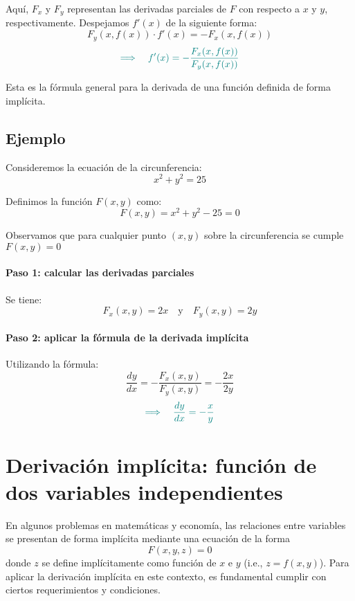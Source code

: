 \documentclass{article}
\begin{document}
Aquí, \( F_x \) y \( F_y \) representan las derivadas parciales de \( F \) con respecto a \( x \) y \( y \), respectivamente. Despejamos \( f'(x) \) de la siguiente forma:
\[
F_y(x,f(x)) \cdot f'(x) = -F_x(x,f(x))
\]
\[
\color{teal}
\Longrightarrow \quad f'(x) = -\frac{F_x(x,f(x))}{F_y(x,f(x))}
\]

Esta es la fórmula general para la derivada de una función definida de forma implícita.
\subsection*{Ejemplo}

Consideremos la ecuación de la circunferencia:
\[
x^2 + y^2 = 25
\]

Definimos la función \( F(x,y) \) como:
\[
F(x,y) = x^2 + y^2 - 25 = 0
\]

Observamos que para cualquier punto \((x,y)\) sobre la circunferencia se cumple \(F(x,y) = 0\)

\paragraph{\color{teal}Paso 1: calcular las derivadas parciales}  
Se tiene:
\[
F_x(x,y) = 2x \quad \text{y} \quad F_y(x,y) = 2y
\]

\paragraph{\color{teal}Paso 2: aplicar la fórmula de la derivada implícita}  
Utilizando la fórmula:
\[
\frac{dy}{dx} = -\frac{F_x(x,y)}{F_y(x,y)} = -\frac{2x}{2y}
\]
\[
\color{teal}
\Longrightarrow \quad \frac{dy}{dx} = -\frac{x}{y}
\]

\section*{Derivación implícita: función de dos variables independientes}

En algunos problemas en matemáticas y economía, las relaciones entre variables se presentan de forma implícita mediante una ecuación de la forma
\[
F(x,y,z) = 0
\]
donde \( z \) se define implícitamente como función de \( x \) e \( y \) (i.e., \( z = f(x,y) \)). Para aplicar la derivación implícita en este contexto, es fundamental cumplir con ciertos requerimientos y condiciones.
\end{document}
